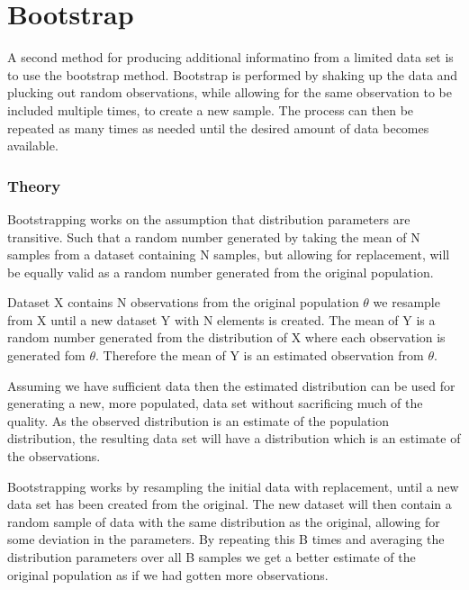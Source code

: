 \chapter{Bootstrap} \label{ch:bootstrap}

A second method for producing additional informatino from a limited data set is to use the bootstrap method. Bootstrap is performed by shaking up the data and plucking out random observations, while allowing for the same observation to be included multiple times, to create a new sample. The process can then be repeated as many times as needed until the desired amount of data becomes available. 

\subsection{Theory}

\iffalse
A good eplaination https://stats.stackexchange.com/questions/26088/explaining-to-laypeople-why-bootstrapping-works
\fi

Bootstrapping works on the assumption that distribution parameters are transitive. Such that a random number generated by taking the mean of N samples from a dataset containing N samples, but allowing for replacement, will be equally valid as a random number generated from the original population.

Dataset X contains N observations from the original population $\theta$ we resample from X until a new dataset Y with N elements is created. The mean of Y is a random number generated from the distribution of X where each observation is generated fom $\theta$. Therefore the mean of Y is an estimated observation from $\theta$.

Assuming we have sufficient data then the estimated distribution can be used for generating a new, more populated, data set without sacrificing much of the quality. As the observed distribution is an estimate of the population distribution, the resulting data set will have a distribution which is an estimate of the observations.

\iffalse %
Bootstrapping works by resampling the initial data with replacement, until a new data set has been created from the original. The new dataset will then contain a random sample of data with the same distribution as the original, allowing for some deviation in the parameters. By repeating this B times and averaging the distribution parameters over all B samples we get a better estimate of the original population as if we had gotten more observations.

